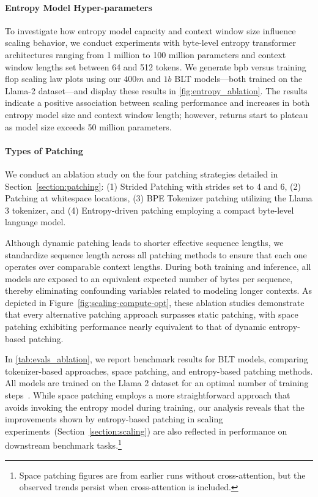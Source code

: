 \paragraph{Entropy Model Hyper-parameters} To investigate how entropy model capacity and context window size influence scaling behavior, we conduct experiments with byte-level entropy transformer architectures ranging from 1 million to 100 million parameters and context window lengths set between 64 and 512 tokens. We generate bpb versus training flop scaling law plots using our $400m$ and $1b$ {\textsc BLT} models—both trained on the Llama-2 dataset—and display these results in \autoref{fig:entropy_ablation}. The results indicate a positive association between scaling performance and increases in both entropy model size and context window length; however, returns start to plateau as model size exceeds 50 million parameters.

\paragraph{Types of Patching}

We conduct an ablation study on the four patching strategies detailed in Section~\ref{section:patching}: (1) Strided Patching with strides set to 4 and 6, (2) Patching at whitespace locations, (3) BPE Tokenizer patching utilizing the Llama 3 tokenizer, and (4) Entropy-driven patching employing a compact byte-level language model.

Although dynamic patching leads to shorter effective sequence lengths, we standardize sequence length across all patching methods to ensure that each one operates over comparable context lengths. During both training and inference, all models are exposed to an equivalent expected number of bytes per sequence, thereby eliminating confounding variables related to modeling longer contexts. As depicted in Figure~\ref{fig:scaling-compute-opt}, these ablation studies demonstrate that every alternative patching approach surpasses static patching, with space patching exhibiting performance nearly equivalent to that of dynamic entropy-based patching.

In \autoref{tab:evals_ablation}, we report benchmark results for {\textsc BLT} models, comparing tokenizer-based approaches, space patching, and entropy-based patching methods. All models are trained on the Llama 2 dataset for an optimal number of training steps~\citep{dubey2024llama}. While space patching employs a more straightforward approach that avoids invoking the entropy model during training, our analysis reveals that the improvements shown by entropy-based patching in scaling experiments~(Section~\ref{section:scaling}) are also reflected in performance on downstream benchmark tasks.\footnote{Space patching figures are from earlier runs without cross-attention, but the observed trends persist when cross-attention is included.}

